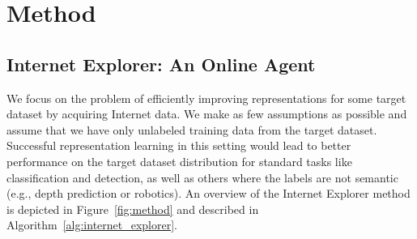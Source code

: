\chapter{Method}




\section{Internet Explorer: An Online Agent}

We focus on the problem of efficiently improving representations for some target dataset by acquiring Internet data.
We make as few assumptions as possible and assume that we have only unlabeled training data from the target dataset. 
Successful representation learning in this setting would lead to better performance on the target dataset distribution for standard tasks like classification and detection, as well as others where the labels are not semantic (e.g., depth prediction or robotics).
An overview of the Internet Explorer method is depicted in Figure~\ref{fig:method} and described in Algorithm~\ref{alg:internet_explorer}.

